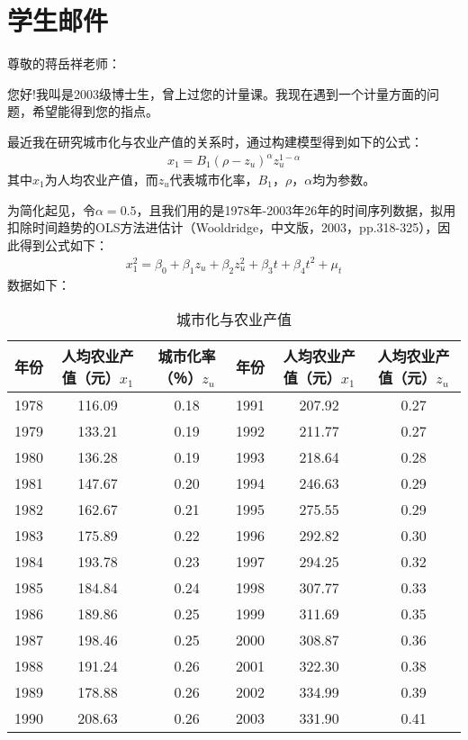 \section{学生邮件}

\noindent 尊敬的蒋岳祥老师：

您好!我叫是2003级博士生，曾上过您的计量课。我现在遇到一个计量方面的问题，希望能得到您的指点。

最近我在研究城市化与农业产值的关系时，通过构建模型得到如下的公式：
\begin{align}
	x_{1}=B_{1}\left(\rho-z_{u}\right)^{\alpha} z_{u}^{1-\alpha}
\end{align}	
其中$ x_{1} $为人均农业产值，而$ z_{u} $代表城市化率，$ B_{1} $，$ \rho $，$ \alpha $均为参数。

为简化起见，令$ \alpha = 0.5 $，且我们用的是1978年-2003年26年的时间序列数据，拟用扣除时间趋势的OLS方法进估计（Wooldridge，中文版，2003，pp.318-325），因此得到公式如下：
\begin{align}
	x_{1}^{2}=\beta_{0}+\beta_{1} z_{u}+\beta_{2} z_{u}^{2}+\beta_{3} t+\beta_{4} t^{2}+\mu_{t}
\end{align}
数据\footnotemark[1]如下：

\begin{table}[ht!]
	\centering
	\caption{城市化与农业产值}
	\begin{tabular}{cccccc}
		\toprule
		年份   & 人均农业产值（元）$x_{1}$ & 城市化率（％）$z_{u}$ & 年份   & 人均农业产值（元）$x_{1}$ & 人均农业产值（元）$z_{u}$ \\
		\midrule
		1978 & 116.09    & 0.18    & 1991 & 207.92    & 0.27      \\
		1979 & 133.21    & 0.19    & 1992 & 211.77    & 0.27      \\
		1980 & 136.28    & 0.19    & 1993 & 218.64    & 0.28      \\
		1981 & 147.67    & 0.20    & 1994 & 246.63    & 0.29      \\
		1982 & 162.67    & 0.21    & 1995 & 275.55    & 0.29      \\
		1983 & 175.89    & 0.22    & 1996 & 292.82    & 0.30      \\
		1984 & 193.78    & 0.23    & 1997 & 294.25    & 0.32      \\
		1985 & 184.84    & 0.24    & 1998 & 307.77    & 0.33      \\
		1986 & 189.86    & 0.25    & 1999 & 311.69    & 0.35      \\
		1987 & 198.46    & 0.25    & 2000 & 308.87    & 0.36      \\
		1988 & 191.24    & 0.26    & 2001 & 322.30    & 0.38      \\
		1989 & 178.88    & 0.26    & 2002 & 334.99    & 0.39      \\
		1990 & 208.63    & 0.26    & 2003 & 331.90    & 0.41      \\
		\bottomrule  
	\end{tabular}
\end{table}

